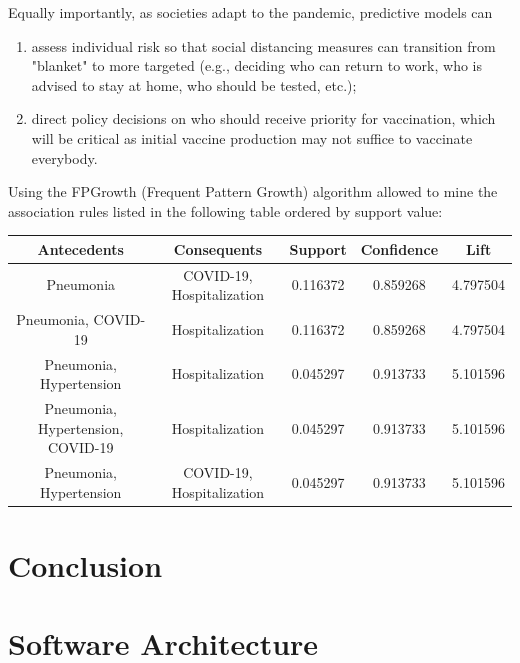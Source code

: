 \documentclass[11pt,a4paper]{article}
\begin{document}
Equally importantly, as societies adapt to the pandemic, predictive models can
\begin{enumerate}
    \item assess individual risk so that social distancing measures can
    transition from "blanket" to more targeted (e.g., deciding who can return to
    work, who is advised to stay at home, who should be tested, etc.);
    \item direct policy decisions on who should receive priority for
    vaccination, which will be critical as initial vaccine production may not
    suffice to vaccinate everybody.
\end{enumerate}
Using the FPGrowth (Frequent Pattern Growth) algorithm allowed to mine the
association rules listed in the following table ordered by support value:
\begin{center}
\hspace*{-1cm}
\begin{tabular}{ | c | c | c | c | c | }
    \rowcolor{gray!50}
    \hline
    Antecedents & Consequents & Support & Confidence & Lift\\
    \hline
    Pneumonia & COVID-19, Hospitalization & 0.116372 & 0.859268 & 4.797504\\
    \hline
    Pneumonia, COVID-19 & Hospitalization & 0.116372 & 0.859268 & 4.797504\\
    \hline
    Pneumonia, Hypertension & Hospitalization & 0.045297 & 0.913733 & 5.101596\\
    \hline
    Pneumonia, Hypertension, COVID-19 & Hospitalization & 0.045297 & 0.913733 & 5.101596\\
    \hline
    Pneumonia, Hypertension & COVID-19, Hospitalization & 0.045297 & 0.913733 & 5.101596\\
    \hline
\end{tabular}
\end{center}
\newpage
\section{Conclusion}

\newpage
\section{Software Architecture}

\newpage
\printbibliography
\end{document}
